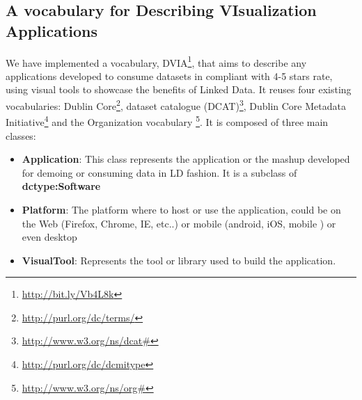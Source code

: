  \subsection{A vocabulary for Describing VIsualization Applications} \label{sec:dvia}

We have implemented a vocabulary, DVIA\footnote{\url{http://bit.ly/Vb4L8k}}, that aims to describe any applications developed to consume datasets in compliant with 4-5 stars rate, using visual tools to showcase the benefits of Linked Data. It reuses four existing vocabularies: Dublin Core\footnote{\url{http://purl.org/dc/terms/}}, dataset catalogue (DCAT)\footnote{\url{http://www.w3.org/ns/dcat\#}}, Dublin Core Metadata Initiative\footnote{\url{http://purl.org/dc/dcmitype}} and the Organization vocabulary \footnote{\url{http://www.w3.org/ns/org\#}}.  It is composed of three main classes:

\begin{itemize}
\item \textbf{Application}: This class represents the application or the mashup developed for demoing or consuming data in LD fashion. It is a subclass of \textbf{dctype:Software}
\item \textbf{Platform}: The platform where to host or use the application, could be on the Web (Firefox, Chrome, IE, etc..) or mobile (android, iOS, mobile ) or even desktop
\item \textbf{VisualTool}: Represents the tool or library used to build the application.
\end{itemize}

\begin{figure}[!htbp]
\vspace{-2.5cm}
\end{figure}

